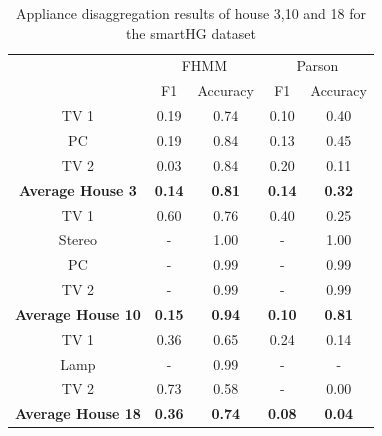 \begin{table}[H]                             
\centering                                   
\begin{tabular}{c|c|c|c|c|}  
\cline{2-5}                                      
 & \multicolumn{2}{|c|}{FHMM} & \multicolumn{2}{c|}{Parson} \\                      
\cline{2-5}                                        
 & F1 & Accuracy & F1 & Accuracy \\          
\hline                                       
\multicolumn{1}{|c|}{TV 1 }& 0.19 & 0.74 & 0.10 & 0.40 \\          
\hline                                       
\multicolumn{1}{|c|}{PC }& 0.19 & 0.84 & 0.13 & 0.45 \\            
\hline                                       
\multicolumn{1}{|c|}{TV 2 }& 0.03 & 0.84 & 0.20 & 0.11 \\          
\hline                                       
\multicolumn{1}{|c|}{\textbf{Average House 3 }}& \textbf{0.14} & \textbf{0.81} & \textbf{0.14} & \textbf{0.32} \\ 
\hline                                       
\multicolumn{1}{|c|}{TV 1} & 0.60 & 0.76 & 0.40 & 0.25 \\          
\hline                                       
\multicolumn{1}{|c|}{Stereo }& - & 1.00 & - & 1.00 \\              
\hline                                       
\multicolumn{1}{|c|}{PC }& - & 0.99 & - & 0.99 \\                  
\hline                                       
\multicolumn{1}{|c|}{TV 2 }& - & 0.99 & - & 0.99 \\                
\hline                                       
\multicolumn{1}{|c|}{\textbf{Average House 10}} & \textbf{0.15} & \textbf{0.94} & \textbf{0.10} & \textbf{0.81} \\
\hline                                       
\multicolumn{1}{|c|}{TV 1} & 0.36 & 0.65 & 0.24 & 0.14 \\          
\hline                                       
\multicolumn{1}{|c|}{Lamp} & - & 0.99 & - & - \\                   
\hline                                       
\multicolumn{1}{|c|}{TV 2} & 0.73 & 0.58 & - & 0.00 \\             
\hline                                       
\multicolumn{1}{|c|}{\textbf{Average House 18} }& \textbf{0.36} & \textbf{0.74} & \textbf{0.08} & \textbf{0.04} \\
\hline                                       
\end{tabular}                                
\caption{Appliance disaggregation results of house 3,10 and 18 for the smartHG dataset}                     
\label{table:Tab:SHGREAL}                    
\end{table}  

